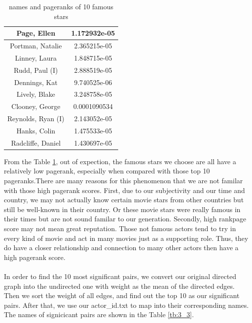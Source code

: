 \documentclass{article}
\begin{document}
\begin {table}[htbp]
\caption{names and pageranks of 10 famous stars}
\begin{adjustbox}{center}
\label{tb:3_2}
\begin{tabular}{|c|c|}
\hline
Page, Ellen &  1.172932e-05\\
\hline
Portman, Natalie & 2.365215e-05 \\
\hline
Linney, Laura & 1.848715e-05 \\
\hline
Rudd, Paul (I) & 2.888519e-05 \\
\hline
Dennings, Kat & 9.740525e-06 \\
\hline
Lively, Blake & 3.248758e-05 \\
\hline
Clooney, George & 0.0001090534 \\
\hline
Reynolds, Ryan (I) & 2.143052e-05 \\
\hline
Hanks, Colin & 1.475533e-05 \\
\hline
Radcliffe, Daniel & 1.430697e-05 \\
\hline
\end{tabular}
\end{adjustbox}
\end{table}
\noindent From the Table \ref{tb:3_2}, out of expection, the famous stars we choose are all have a relatively low pagerank, especially when compared with those top 10 pageranks.There are many reasons for this phenomenon that we are not familar with those high pagerank scores. First, due to our subjectivity and our time and country, we may not actually know certain movie stars from other countries but still be well-known in their country. Or these movie stars were really famous in their times but are not sound familar to our generation. Secondly, high rankpage score may not mean great reputation. Those not famous actors tend to try in every kind of movie and act in many movies just as a supporting role. Thus, they do have a closer relationship and connection to many other actors then have a high pagerank score. \\
\\In order to find the 10 most significant pairs, we convert our original directed graph into the undirected one with weight as the mean of the directed edges. Then we sort the weight of all edges, and find out the top 10 as our significant pairs. After that, we use our actor\_id.txt to map into their corresponding names. The names of signicicant pairs are shown in the Table \ref{tb:3_3}.
\end{document}
